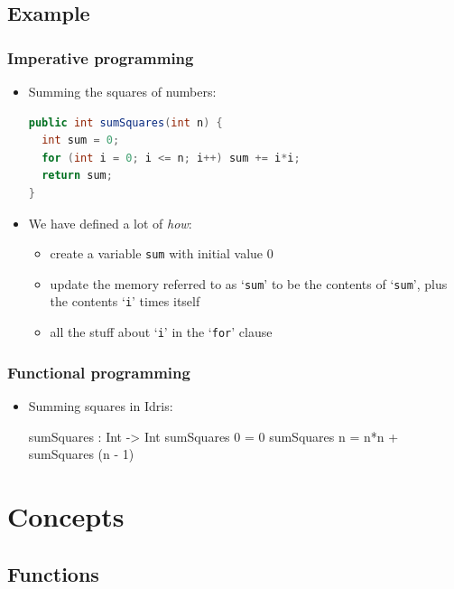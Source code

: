 \documentclass{beamer}
\begin{document}
  \subsection{Example}
  \begin{frame}[fragile]
    \frametitle{Imperative programming}
    \begin{itemize}
      \item Summing the squares of numbers:
            {\footnotesize
            \begin{lstlisting}[language=java]
public int sumSquares(int n) {
  int sum = 0;
  for (int i = 0; i <= n; i++) sum += i*i;
  return sum;
}
            \end{lstlisting}
            }
      \item We have defined a lot of \textit{how}:
            \begin{itemize}
              \item create a variable \texttt{sum} with initial value 0
              \item update the memory referred to as `\texttt{sum}' to be the
                    contents of `\texttt{sum}', plus the contents `\texttt{i}'
                    times itself
              \item all the stuff about `\texttt{i}' in the `\texttt{for}' clause
            \end{itemize}
    \end{itemize}

  \end{frame}

  \begin{frame}[fragile]
    \frametitle{Functional programming}
    \begin{itemize}
      \item Summing squares in Idris:
            {\footnotesize
            \begin{idrislisting}
sumSquares : Int -> Int
sumSquares 0 = 0
sumSquares n = n*n + sumSquares (n - 1)
            \end{idrislisting}
            }
    \end{itemize}
  \end{frame}
\fi

\section{Concepts}
\subsection{Functions}
\end{document}
